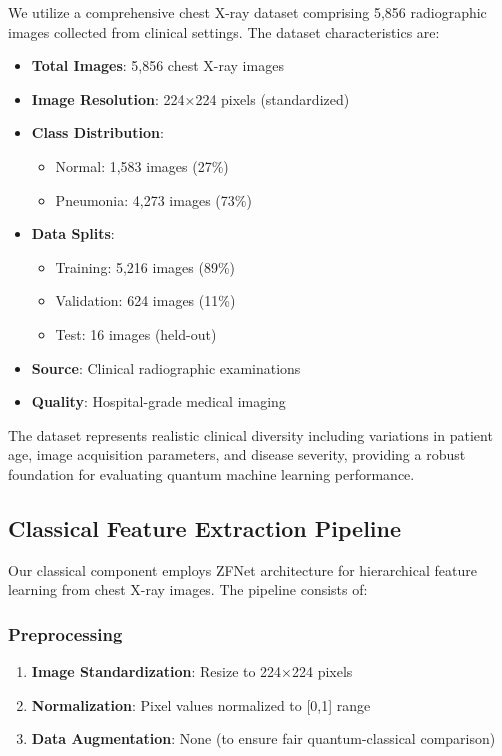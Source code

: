 \documentclass[conference]{IEEEtran}
\begin{document}
We utilize a comprehensive chest X-ray dataset comprising 5,856 radiographic images collected from clinical settings. The dataset characteristics are:

\begin{itemize}
    \item \textbf{Total Images}: 5,856 chest X-ray images
    \item \textbf{Image Resolution}: 224×224 pixels (standardized)
    \item \textbf{Class Distribution}: 
        \begin{itemize}
            \item Normal: 1,583 images (27\%)
            \item Pneumonia: 4,273 images (73\%)
        \end{itemize}
    \item \textbf{Data Splits}:
        \begin{itemize}
            \item Training: 5,216 images (89\%)
            \item Validation: 624 images (11\%)
            \item Test: 16 images (held-out)
        \end{itemize}
    \item \textbf{Source}: Clinical radiographic examinations
    \item \textbf{Quality}: Hospital-grade medical imaging
\end{itemize}

The dataset represents realistic clinical diversity including variations in patient age, image acquisition parameters, and disease severity, providing a robust foundation for evaluating quantum machine learning performance.

\subsection{Classical Feature Extraction Pipeline}

Our classical component employs ZFNet architecture for hierarchical feature learning from chest X-ray images. The pipeline consists of:

\subsubsection{Preprocessing}
\begin{enumerate}
    \item \textbf{Image Standardization}: Resize to 224×224 pixels
    \item \textbf{Normalization}: Pixel values normalized to [0,1] range
    \item \textbf{Data Augmentation}: None (to ensure fair quantum-classical comparison)
\end{enumerate}
\end{document}
